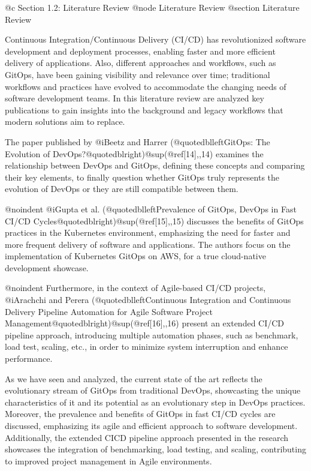 @c Section 1.2: Literature Review
@node Literature Review
@section Literature Review

Continuous Integration/Continuous Delivery (CI/CD) has revolutionized software development and deployment processes, enabling faster and more efficient delivery of applications. Also, different approaches and workflows, such as GitOps, have been gaining visibility and relevance over time; traditional workflows and practices have evolved to accommodate the changing needs of software development teams. In this literature review are analyzed key publications to gain insights into the background and legacy workflows that modern solutions aim to replace.

The paper published by @i{Beetz and Harrer (@quotedblleft{}GitOps: The Evolution of DevOps?@quotedblright{})}@sup{(@ref{[14],,14})} examines the relationship between DevOps and GitOps, defining these concepts and comparing their key elements, to finally question whether GitOps truly represents the evolution of DevOps or they are still compatible between them.

@noindent @i{Gupta et al. (@quotedblleft{}Prevalence of GitOps, DevOps in Fast CI/CD Cycles@quotedblright{})}@sup{(@ref{[15],,15})} discusses the benefits of GitOps practices in the Kubernetes environment, emphasizing the need for faster and more frequent delivery of software and applications. The authors focus on the implementation of Kubernetes GitOps on AWS, for a true cloud-native development showcase.

@noindent Furthermore, in the context of Agile-based CI/CD projects, @i{Arachchi and Perera (@quotedblleft{}Continuous Integration and Continuous Delivery Pipeline Automation for Agile Software Project Management@quotedblright{})}@sup{(@ref{[16],,16})} present an extended CI/CD pipeline approach, introducing multiple automation phases, such as benchmark, load test, scaling, etc., in order to minimize system interruption and enhance performance.

As we have seen and analyzed, the current state of the art reflects the evolutionary stream of GitOps from traditional DevOps, showcasting the unique characteristics of it and its potential as an evolutionary step in DevOps practices. Moreover, the prevalence and benefits of GitOps in fast CI/CD cycles are discussed, emphasizing its agile and efficient approach to software development. Additionally, the extended CICD pipeline approach presented in the research showcases the integration of benchmarking, load testing, and scaling, contributing to improved project management in Agile environments.
